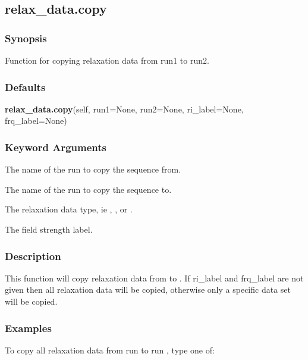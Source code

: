 \newpage

\subsection{relax\_data.copy}


\subsubsection{Synopsis}

Function for copying relaxation data from run1 to run2.

\subsubsection{Defaults}

\textsf{\textbf{relax\_data.copy}(self, run1=None, run2=None, ri\_label=None, frq\_label=None)}


\subsubsection{Keyword Arguments}


  The name of the run to copy  the sequence  from.

  The name of the run to copy  the sequence  to.

  The relaxation  data type, ie 
, 
, or 
.

  The field strength label.

\subsubsection{Description}

This function will copy  relaxation  data from 
 to 
.  If ri\_label and frq\_label
are not given then all relaxation  data will be copied, otherwise only a specific data set
will be copied.


\subsubsection{Examples}

To copy  all relaxation  data from run 
 to run 
, type one of:


